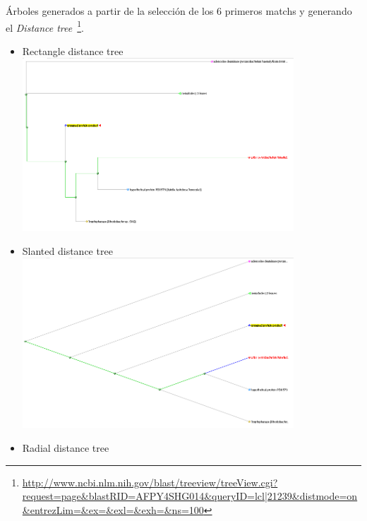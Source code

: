 Árboles generados a partir de la selección de los 6 primeros matchs y generando el \emph{Distance tree}~\footnote{\url{http://www.ncbi.nlm.nih.gov/blast/treeview/treeView.cgi?request=page&blastRID=AFPY4SHG014&queryID=lcl|21239&distmode=on&entrezLim=&ex=&exl=&exh=&ns=100}}.
\begin{itemize}
	\item Rectangle distance tree\\

	\includegraphics[width=0.8\textwidth]{img/tree_rectangle}
%
	\item Slanted distance tree\\

	\includegraphics[width=0.8\textwidth]{img/tree_slanted}
%
	\item Radial distance tree\\


\end{itemize}
